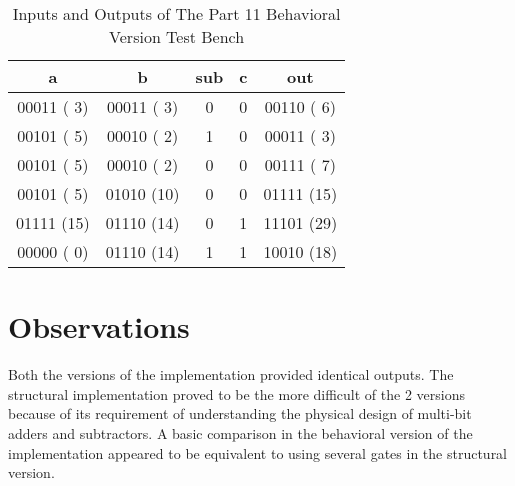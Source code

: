 \documentclass[paper=usletter, fontsize=12pt]{article}
\begin{document}
        \begin{table}[h]
            \caption{Inputs and Outputs of The Part 11 Behavioral Version Test Bench}

            \centering
            \begin{tabular*}{200pt}{@{\extracolsep{\fill}} ccccc}

            \textbf{a} & \textbf{b} & \textbf{sub} & \textbf{c} & \textbf{out} \\
            \hline
            00011 ( 3) & 00011 ( 3) & 0 & 0 & 00110 ( 6) \\
            00101 ( 5) & 00010 ( 2) & 1 & 0 & 00011 ( 3) \\
            00101 ( 5) & 00010 ( 2) & 0 & 0 & 00111 ( 7) \\
            00101 ( 5) & 01010 (10) & 0 & 0 & 01111 (15) \\
            01111 (15) & 01110 (14) & 0 & 1 & 11101 (29) \\
            00000 ( 0) & 01110 (14) & 1 & 1 & 10010 (18) \\
            \end{tabular*}
        \end{table}

    \section{Observations}
    Both the versions of the implementation provided identical outputs. The structural implementation proved to be the more difficult of the 2 versions because of its requirement of understanding the physical design of multi-bit adders and subtractors. A basic comparison in the behavioral version of the implementation appeared to be equivalent to using several gates in the structural version.
\end{document}
